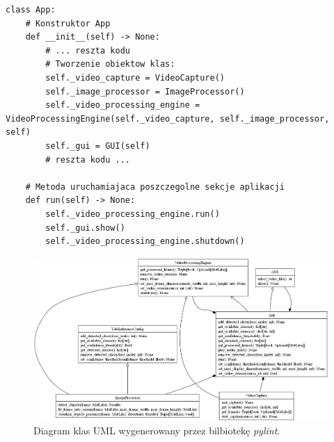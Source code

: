 \begin{lstlisting}[caption={Tworzenie obiektów klas wewnątrz \emph{App} oraz uruchomienie w niej różnych sekcji aplikacji.}, label={lst:app-instancjowanie}]
class App:
    # Konstruktor App
    def __init__(self) -> None:
        # ... reszta kodu
        # Tworzenie obiektow klas:
        self._video_capture = VideoCapture()
        self._image_processor = ImageProcessor()
        self._video_processing_engine = VideoProcessingEngine(self._video_capture, self._image_processor, self)
        self._gui = GUI(self)
        # reszta kodu ...

    # Metoda uruchamiajaca poszczegolne sekcje aplikacji
    def run(self) -> None:
        self._video_processing_engine.run()
        self._gui.show()
        self._video_processing_engine.shutdown()
\end{lstlisting}





\begin{figure}[H]
    \centering
    \includegraphics[angle=270, scale = 0.85]{r_implementacja/klasy/classes_MyProject.png}
    \caption{Diagram klas UML wygenerowany przez bilbiotekę \emph{pylint}.}
    \label{fig:diagram-klas}
\end{figure}
